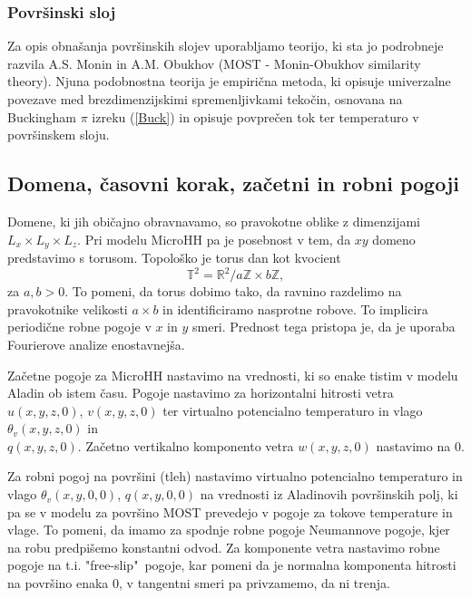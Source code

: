 \documentclass[mat2, tisk]{fmfdelo}
\newcommand{\Z}{\mathbb Z}
\begin{document}
\subsubsection{Površinski sloj}
Za opis obnašanja površinskih slojev uporabljamo teorijo, ki sta jo podrobneje razvila A.S. 
Monin in A.M. Obukhov\cite{monin1954most} (MOST - Monin-Obukhov similarity theory). Njuna podobnostna teorija
je empirična metoda, ki opisuje univerzalne povezave med 
brezdimenzijskimi spremenljivkami tekočin, osnovana na 
Buckingham $\pi$ izreku (\ref{Buck}) in opisuje 
povprečen tok ter temperaturo v površinskem sloju.

\subsection{Domena, časovni korak, začetni in robni pogoji}

Domene, ki jih običajno obravnavamo, so pravokotne oblike z dimenzijami
$L_x \times L_y \times L_z$. Pri modelu MicroHH pa je posebnost v tem, da
$xy$ domeno predstavimo s torusom. Topološko je torus dan 
kot kvocient 
$$\mathbb{T}^2 = \mathbb{R}^2 / {a\Z \times b\Z},$$ 
za $a, b > 0$. To pomeni, da torus dobimo tako, da ravnino razdelimo 
na pravokotnike velikosti $a \times b$ in identificiramo
nasprotne robove. To implicira periodične robne pogoje v $x$ in $y$ smeri.
Prednost tega pristopa je, da je uporaba Fourierove analize enostavnejša.

Začetne pogoje za MicroHH nastavimo na vrednosti, ki so enake tistim 
v modelu Aladin ob istem času. Pogoje nastavimo za horizontalni 
hitrosti vetra $u(x,y,z,0)$, $v(x,y,z,0)$ ter virtualno potencialno 
temperaturo in vlago $\theta_v(x,y,z,0)$ in \\$q(x,y,z,0)$.
Začetno vertikalno komponento vetra $w(x,y,z,0)$ nastavimo na $0$.

Za robni pogoj na površini (tleh) nastavimo virtualno potencialno
temperaturo in vlago $\theta_v(x,y,0,0)$, $q(x,y,0,0)$ na vrednosti 
iz Aladinovih površinskih polj, ki pa se v modelu za površino 
MOST prevedejo v pogoje za tokove temperature in vlage. To 
pomeni, da imamo za spodnje robne pogoje Neumannove pogoje, 
kjer na robu predpišemo konstantni odvod. Za komponente vetra 
nastavimo robne pogoje na t.i. "free-slip"\, pogoje, kar pomeni da 
je normalna komponenta hitrosti na površino enaka 0, v tangentni
smeri pa privzamemo, da ni trenja.
\end{document}
